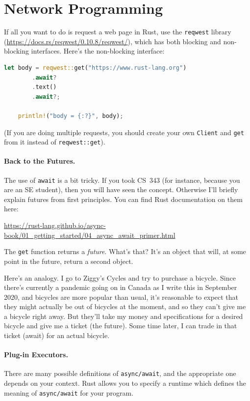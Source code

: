 \section*{Network Programming}
If all you want to do is request a web page in Rust, use
the \texttt{reqwest} library (\url{https://docs.rs/reqwest/0.10.8/reqwest/}),
which has both blocking and non-blocking interfaces. Here's the
non-blocking interface:
    \begin{lstlisting}[language=Rust]
    let body = reqwest::get("https://www.rust-lang.org")
        .await?
        .text()
        .await?;

    println!("body = {:?}", body);
\end{lstlisting}
(If you are doing multiple requests,
you should create your own \texttt{Client} and \texttt{get} from it instead of
\texttt{reqwest::get}).

\paragraph{Back to the Futures.}
The use of \texttt{await} is a bit tricky. If you took CS~343
(for instance, because you are an SE student), then you will have seen
the concept. Otherwise I'll briefly explain futures from first principles.
You can find Rust documentation on them here:
\begin{center}
\url{https://rust-lang.github.io/async-book/01_getting_started/04_async_await_primer.html}
\end{center}

The \texttt{get} function returns a \emph{future}. What's that? It's
an object that will, at some point in the future, return a second
object.

Here's an analogy. I go to Ziggy's Cycles and try to purchase a
bicycle. Since there's currently a pandemic going on in Canada as I
write this in September 2020, and bicycles are more popular than
usual, it's reasonable to expect that they might actually be out of
bicycles at the moment, and so they can't
give me a bicycle right away. But they'll take my money and
specifications for a desired bicycle and give me a ticket (the
future). Some time later, I can trade in that ticket (await) for an
actual bicycle.

\paragraph{Plug-in Executors.}
There are many possible definitions of \texttt{async/await}, and the appropriate
one depends on your context. Rust allows you to specify a runtime
which defines the meaning of \texttt{async/await} for your program.

